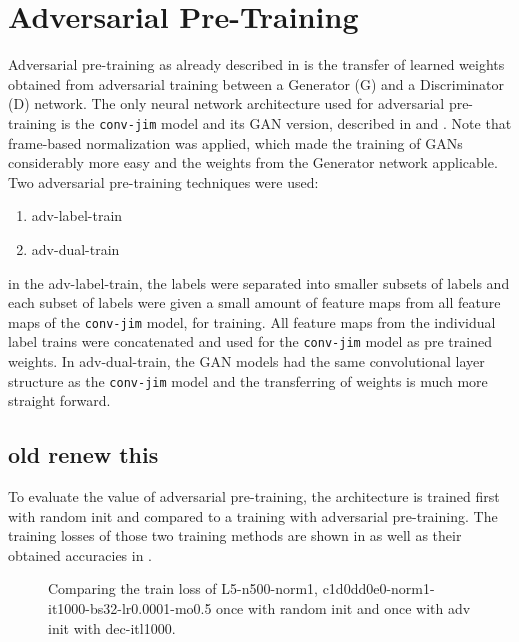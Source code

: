 
\section{Adversarial Pre-Training}\label{sec:exp_adv}
\thesisStateNotReady
Adversarial pre-training as already described in  is the transfer of learned weights obtained from adversarial training between a Generator (G) and a Discriminator (D) network.
The only neural network architecture used for adversarial pre-training is the \texttt{conv-jim} model and its GAN version, described in  and .
Note that frame-based normalization was applied, which made the training of GANs considerably more easy and the weights from the Generator network applicable.
Two adversarial pre-training techniques were used:
\begin{enumerate}
  \item adv-label-train 
  \item adv-dual-train
\end{enumerate}
in the adv-label-train, the labels were separated into smaller subsets of labels and each subset of labels were given a small amount of feature maps from all feature maps of the \texttt{conv-jim} model, for training. 
All feature maps from the individual label trains were concatenated and used for the \texttt{conv-jim} model as pre trained weights.
In adv-dual-train, the GAN models had the same convolutional layer structure as the \texttt{conv-jim} model and the transferring of weights is much more straight forward.

\subsection{old renew this}
To evaluate the value of adversarial pre-training, the architecture is trained first with random init and compared to a training with adversarial pre-training. 
The training losses of those two training methods are shown in  as well as their obtained accuracies in .

\begin{figure}[!ht]
  \centering
  \caption{Comparing the train loss of L5-n500-norm1, c1d0dd0e0-norm1-it1000-bs32-lr0.0001-mo0.5 once with random init and once with adv init with dec-itl1000.}
  \label{fig:exp_adv_fc3_train_loss}
\end{figure}
\FloatBarrier
\noindent

